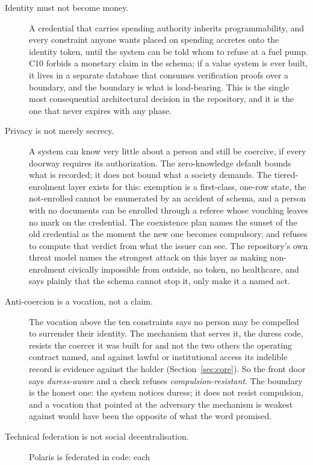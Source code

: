 \begin{description}
  \item[Identity must not become money.] A credential that carries spending authority inherits
    programmability, and every constraint anyone wants placed on spending accretes onto the identity
    token, until the system can be told whom to refuse at a fuel pump. C10 forbids a monetary claim
    in the schema; if a value system is ever built, it lives in a separate database that consumes
    verification proofs over a boundary, and the boundary is what is load-bearing. This is the single
    most consequential architectural decision in the repository, and it is the one that never
    expires with any phase.
  \item[Privacy is not merely secrecy.] A system can know very little about a person and still be
    coercive, if every doorway requires its authorization. The zero-knowledge default bounds what is
    recorded; it does not bound what a society demands. The tiered-enrolment layer exists for this:
    exemption is a first-class, one-row state, the not-enrolled cannot be enumerated by an accident
    of schema, and a person with no documents can be enrolled through a referee whose vouching leaves
    no mark on the credential. The coexistence plan names the sunset of the old credential as the
    moment the new one becomes compulsory, and refuses to compute that verdict from what the issuer
    can see. The repository's own threat model names the strongest attack on this layer as making
    non-enrolment civically impossible from outside, no token, no healthcare, and says plainly that
    the schema cannot stop it, only make it a named act.
  \item[Anti-coercion is a vocation, not a claim.] The vocation above the ten constraints says no
    person may be compelled to surrender their identity. The mechanism that serves it, the duress
    code, resists the coercer it was built for and not the two others the operating contract named,
    and against lawful or institutional access its indelible record is evidence against the holder
    (Section~\ref{sec:core}). So the front door says \emph{duress-aware} and a check refuses
    \emph{compulsion-resistant}. The boundary is the honest one: the system notices duress; it does
    not resist compulsion, and a vocation that pointed at the adversary the mechanism is weakest
    against would have been the opposite of what the word promised.
  \item[Technical federation is not social decentralisation.] Polaris is federated in code: each

\end{description}
